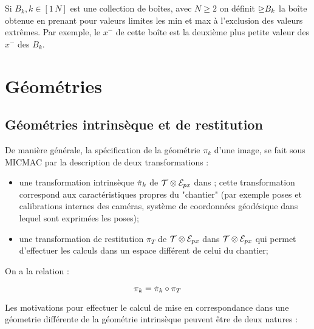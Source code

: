 Si $B_k,k \in [1\, N]$ est une collection de
bo\^ites, avec $N\geq 2$ on d\'efinit  $\DeuxExtre B_k$
la bo\^ite obtenue en prenant pour valeurs limites
les min et max \`a l'exclusion des valeurs extr\^emes.
Par exemple, le  $x^-$ de cette bo\^ite est la deuxi\`eme plus petite
valeur des $x^-$ des $B_k$.


\section{G\'eom\'etries}

\subsection{G\'eom\'etries intrins\`eque  et de  restitution}

\label{Geom:Intr:Rest}

De mani\`ere g\'en\'erale, la sp\'ecification de  la g\'eom\'etrie 
$\pi_k$ d'une image, se fait sous MICMAC par la description de
deux transformations : 

\begin{itemize}
   \item une transformation  intrins\`eque $\PiI_k$ de $\ETer \otimes \EPx $ 
         dans \EIm;
         cette transformation correspond aux caract\'eristiques propres
         du "chantier" (par exemple poses et calibrations internes des cam\'eras,
         syst\`eme de coordonn\'ees g\'eod\'esique dans lequel sont exprim\'ees
         les poses);
         
          
   \item une transformation de restitution $\pi_T$ de  $\ETer \otimes \EPx $
         dans $\ETer \otimes \EPx $ qui permet d'effectuer les calculs dans
         un espace diff\'erent de celui du chantier;
\end{itemize}

On a la relation :

\begin{equation}
   \pi_k = \PiI_k \circ \pi_T
\end{equation}

Les motivations pour effectuer le calcul de mise en correspondance dans
une g\'eometrie diff\'erente de la g\'eom\'etrie intrins\`eque
peuvent \^etre de deux natures :


